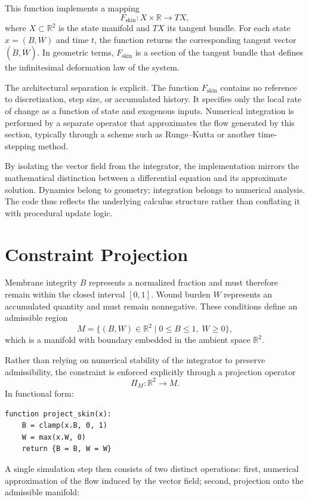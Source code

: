 \documentclass[12pt]{book}
\begin{document}
This function implements a mapping
\[
F_{\text{skin}} : X \times \mathbb{R} \to TX,
\]
where $X \subset \mathbb{R}^2$ is the state manifold and $TX$ its tangent
bundle. For each state $x = (B,W)$ and time $t$, the function returns the
corresponding tangent vector $(\dot B, \dot W)$. In geometric terms,
$F_{\text{skin}}$ is a section of the tangent bundle that defines the
infinitesimal deformation law of the system.

The architectural separation is explicit. The function $F_{\text{skin}}$
contains no reference to discretization, step size, or accumulated history.
It specifies only the local rate of change as a function of state and
exogenous inputs. Numerical integration is performed by a separate operator
that approximates the flow generated by this section, typically through a
scheme such as Runge--Kutta or another time-stepping method.

By isolating the vector field from the integrator, the implementation mirrors
the mathematical distinction between a differential equation and its
approximate solution. Dynamics belong to geometry; integration belongs to
numerical analysis. The code thus reflects the underlying calculus structure
rather than conflating it with procedural update logic.

\section{Constraint Projection}

Membrane integrity $B$ represents a normalized fraction and must
therefore remain within the closed interval $[0,1]$. Wound burden $W$
represents an accumulated quantity and must remain nonnegative.
These conditions define an admissible region
\[
M = \{ (B,W) \in \mathbb{R}^2 \mid 0 \le B \le 1,\; W \ge 0 \},
\]
which is a manifold with boundary embedded in the ambient space
$\mathbb{R}^2$.

Rather than relying on numerical stability of the integrator to
preserve admissibility, the constraint is enforced explicitly through
a projection operator
\[
\Pi_M : \mathbb{R}^2 \to M.
\]
In functional form:

\begin{verbatim}
function project_skin(x):
    B = clamp(x.B, 0, 1)
    W = max(x.W, 0)
    return {B = B, W = W}
\end{verbatim}

A single simulation step then consists of two distinct operations:
first, numerical approximation of the flow induced by the vector field;
second, projection onto the admissible manifold:
\end{document}
